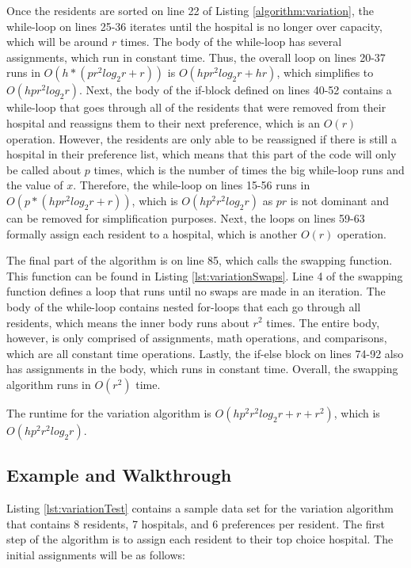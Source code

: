 \documentclass[letterpaper, 10pt,DIV=13]{scrartcl}
\numberwithin{equation}{section} %
\numberwithin{figure}{section} %
\numberwithin{table}{section} %
\begin{document}
Once the residents are sorted on line 22 of Listing \ref{algorithm:variation}, the while-loop on lines 25-36 iterates until the hospital is no longer over capacity, which will be around $r$ times. The body of the while-loop has several assignments, which run in constant time. Thus, the overall loop on lines 20-37 runs in $O(h * (pr^2log_2r + r))$ is $O(hpr^2log_2r + hr)$, which simplifies to $O(hpr^2log_2r)$. Next, the body of the if-block defined on lines 40-52 contains a while-loop that goes through all of the residents that were removed from their hospital and reassigns them to their next preference, which is an $O(r)$ operation. However, the residents are only able to be reassigned if there is still a hospital in their preference list, which means that this part of the code will only be called about $p$ times, which is the number of times the big while-loop runs and the value of $x$. Therefore, the while-loop on lines 15-56 runs in $O(p *(hpr^2log_2r + r))$, which is $O(hp^2r^2log_2r)$ as $pr$ is not dominant and can be removed for simplification purposes. Next, the loops on lines 59-63 formally assign each resident to a hospital, which is another $O(r)$ operation.

The final part of the algorithm is on line 85, which calls the swapping function. This function can be found in Listing \ref{lst:variationSwaps}. Line 4 of the swapping function defines a loop that runs until no swaps are made in an iteration. The body of the while-loop contains nested for-loops that each go through all residents, which means the inner body runs about $r^2$ times. The entire body, however, is only comprised of assignments, math operations, and comparisons, which are all constant time operations. Lastly, the if-else block on lines 74-92 also has assignments in the body, which runs in constant time. Overall, the swapping algorithm runs in $O(r^2)$ time.

The runtime for the variation algorithm is $O(hp^2r^2log_2r + r + r^2)$, which is $O(hp^2r^2log_2r)$.

\subsection{Example and Walkthrough}
Listing \ref{lst:variationTest} contains a sample data set for the variation algorithm that contains 8 residents, 7 hospitals, and 6 preferences per resident. The first step of the algorithm is to assign each resident to their top choice hospital. The initial assignments will be as follows:
\end{document}
